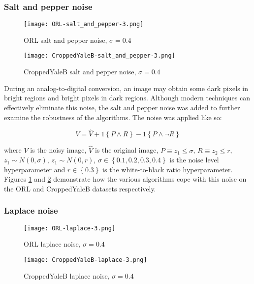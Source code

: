 \documentclass{article} %
\begin{document}
\subsubsection{Salt and pepper noise}
\begin{figure}
\texttt{[image: ORL-salt\_and\_pepper-3.png]}
\caption{ORL salt and pepper noise, $\sigma=0.4$ \label{fig:ORL-salt_and_pepper-3}}
\end{figure}
\begin{figure}
\texttt{[image: CroppedYaleB-salt\_and\_pepper-3.png]}
\caption{CroppedYaleB salt and pepper noise, $\sigma=0.4$ \label{fig:CroppedYaleB-salt_and_pepper-3}}
\end{figure}

During an analog-to-digital conversion, an image may obtain some dark pixels in bright regions and bright pixels in dark regions. \cite{noise} Although modern techniques can effectively eliminate this noise, the salt and pepper noise was added to further examine the robustness of the algorithms. The noise was applied like so:

\begin{equation}
V = \hat{V} + 1\left\{P \land R\right\} - 1\left\{P \land \lnot R\right\}
\end{equation}

where $V$ is the noisy image, $\hat{V}$ is the original image, $P \equiv z_1 \leq \sigma$, $R \equiv z_2 \leq r$, $z_1 \sim N\left(0,\sigma\right)$, $z_1 \sim N\left(0,r\right)$, $\sigma \in \left\{0.1,0.2,0.3,0.4\right\}$ is the noise level hyperparameter and $r \in \left\{0.3\right\} $ is the white-to-black ratio hyperparameter. Figures \ref{fig:ORL-salt_and_pepper-3} and \ref{fig:CroppedYaleB-salt_and_pepper-3} demonstrate how the various algorithms cope with this noise on the ORL and CroppedYaleB datasets respectively.

\subsubsection{Laplace noise}
\begin{figure}
\texttt{[image: ORL-laplace-3.png]}
\caption{ORL laplace noise, $\sigma=0.4$ \label{fig:ORL-laplace-3}}
\end{figure}
\begin{figure}
\texttt{[image: CroppedYaleB-laplace-3.png]}
\caption{CroppedYaleB laplace noise, $\sigma=0.4$ \label{fig:CroppedYaleB-laplace-3}}
\end{figure}
\end{document}
